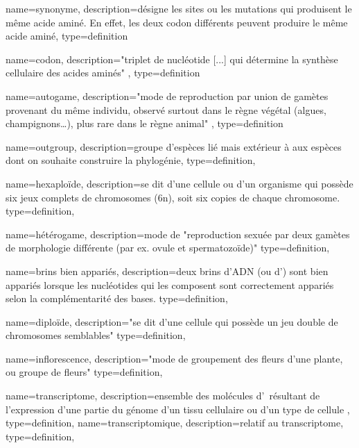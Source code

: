  {
    name=synonyme,
    description={désigne les sites ou les mutations qui produisent le même acide aminé. En effet, les deux \gls{codon} différents peuvent produire le même acide aminé},
    type=definition
}

 {
    name=codon,
    description={"triplet de \gls{nucléotide} [...] qui détermine la synthèse cellulaire des acides aminés" \cite{Robert}},
    type=definition
}


 {
    name=autogame,
    description={"mode de reproduction par union de gamètes provenant du même individu, observé surtout dans le règne végétal (algues, champignons…), plus rare dans le règne animal" \cite{Robert}},
    type=definition
}

 {
    name=outgroup,
    description={groupe d'espèces lié mais extérieur à aux espèces dont on souhaite construire la \gls{phylogénie}},
    type=definition,
}

% 
 {
    name=hexaploïde,
    description={se dit d'une cellule ou d'un organisme qui possède six jeux complets de chromosomes (6n), soit six copies de chaque chromosome.}
    type=definition,
}
 
 {
    name=hétérogame,
    description={mode de "reproduction sexuée par deux gamètes de morphologie différente (par ex. ovule et spermatozoïde)" \cite{Robert}}
    type=definition,
}

 {
    name=brins bien appariés,
    description={deux brins d'ADN (ou d'\ARN) sont bien appariés lorsque les \glspl{nucléotide} qui les composent sont correctement appariés selon la complémentarité des bases.}
    type=definition,
}

 {
    name=diploïde,
    description={"se dit d'une cellule qui possède un jeu double de chromosomes semblables" \cite{Robert}}
    type=definition,
}

 {
    name=inflorescence,
    description={"mode de groupement des fleurs d'une plante, ou groupe de fleurs" \cite{LeDico}}
    type=definition,
}

 {
    name=transcriptome,
    description={ensemble des molécules d'\ARN résultant de l'expression d'une partie du génome d'un tissu cellulaire ou d'un type de cellule \cite{LeDico}},
    type=definition,
}
 {
    name=transcriptomique,
    description={relatif au \gls{transcriptome}},
    type=definition,
}


